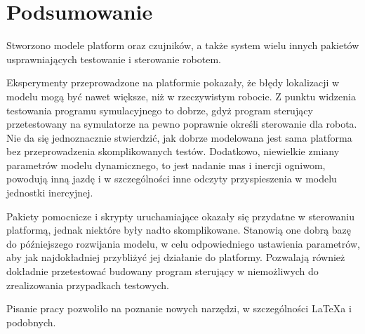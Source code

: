 \chapter{Podsumowanie}
\label{sec:ending}

Stworzono modele platform oraz czujników, a także system wielu innych pakietów usprawniających testowanie i sterowanie robotem.

Eksperymenty przeprowadzone na platformie pokazały, że błędy lokalizacji w modelu mogą być nawet większe, niż w rzeczywistym robocie.
Z punktu widzenia testowania programu symulacyjnego to dobrze, gdyż program sterujący przetestowany na symulatorze na pewno poprawnie określi sterowanie
dla robota.
Nie da się jednoznacznie stwierdzić, jak dobrze modelowana jest sama platforma bez przeprowadzenia skomplikowanych testów.
Dodatkowo, niewielkie zmiany parametrów modelu dynamicznego, to jest nadanie mas i inercji ogniwom, powodują inną jazdę i w szczególności inne odczyty 
przyspieszenia w modelu jednostki inercyjnej.

Pakiety pomocnicze i skrypty uruchamiające okazały się przydatne w sterowaniu platformą, jednak niektóre były nadto skomplikowane.
Stanowią one dobrą bazę do późniejszego rozwijania modelu, w celu odpowiedniego ustawienia parametrów, aby jak najdokładniej przybliżyć jej działanie do platformy.
Pozwalają również dokładnie przetestować budowany program sterujący w niemożliwych do zrealizowania przypadkach testowych.

Pisanie pracy pozwoliło na poznanie nowych narzędzi, w szczególności \LaTeX{}a i podobnych.
